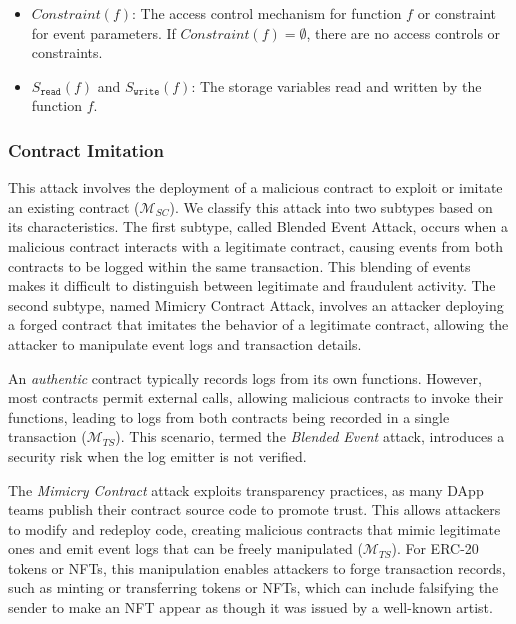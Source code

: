 \begin{itemize}
    \item \( Constraint(f) \): The access control mechanism for function \( f \) or constraint for event parameters. If \( Constraint(f) = \emptyset \), there are no access controls or constraints.
    \item \( S_{\texttt{read}}(f) \) and \( S_{\texttt{write}}(f) \): The storage variables read and written by the function \( f \).
\end{itemize}

\subsubsection{Contract Imitation}\label{vec:attack3}

This attack involves the deployment of a malicious contract to exploit or imitate an existing contract (\(\bm{\mathcal{M}}_{SC}\)). We classify this attack into two subtypes based on its characteristics. The first subtype, called Blended Event Attack, occurs when a malicious contract interacts with a legitimate contract, causing events from both contracts to be logged within the same transaction. This blending of events makes it difficult to distinguish between legitimate and fraudulent activity. The second subtype, named Mimicry Contract Attack, involves an attacker deploying a forged contract that imitates the behavior of a legitimate contract, allowing the attacker to manipulate event logs and transaction details.


An \emph{authentic} contract typically records logs from its own functions. However, most contracts permit external calls, allowing malicious contracts to invoke their functions, leading to logs from both contracts being recorded in a single transaction (\(\bm{\mathcal{M}}_{TS}\)). This scenario, termed the \emph{Blended Event} attack, introduces a security risk when the log emitter is not verified.

The \emph{Mimicry Contract} attack exploits transparency practices, as many DApp teams publish their contract source code to promote trust. This allows attackers to modify and redeploy code, creating malicious contracts that mimic legitimate ones and emit event logs that can be freely manipulated (\(\bm{\mathcal{M}}_{TS}\)). For ERC-20 tokens or NFTs, this manipulation enables attackers to forge transaction records, such as minting or transferring tokens or NFTs, which can include falsifying the sender to make an NFT appear as though it was issued by a well-known artist.

